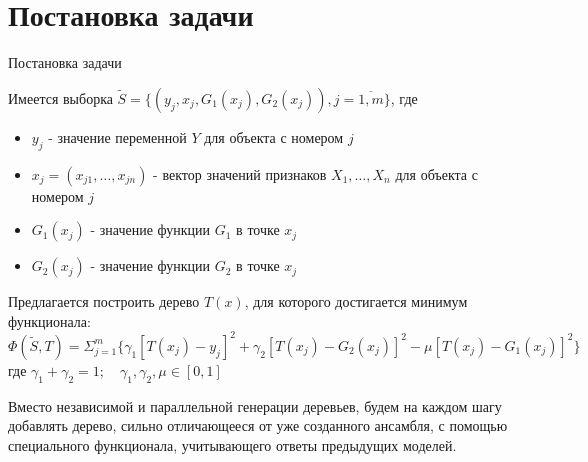 \documentclass[10pt,pdf,hyperref={unicode}]{beamer}
\begin{document}
	\section{Постановка задачи}
	\begin{frame}{Постановка задачи}
		
		Имеется выборка $\tilde{S} = \{ (y_j, x_j, G_1(x_j), G_2(x_j)), j = \overline{1, m} \}$, где
		\begin{itemize}
			\item $y_j$ - значение переменной $Y$ для объекта с номером $j$
			\item $x_j = (x_{j1}, \dots, x_{jn})$ - вектор значений признаков $X_1, \dots, X_n$ для объекта с номером $j$
			\item $G_1(x_j)$ - значение функции $G_1$ в точке $x_j$
			\item $G_2(x_j)$ - значение функции $G_2$ в точке $x_j$
		\end{itemize}
		
		Предлагается построить дерево $T(x)$, для которого достигается минимум функционала:
		$$ \Phi(\tilde{S}, T) = \Sigma_{j=1}^{m} \{ \gamma_1 [T(x_j) - y_j]^2 + \gamma_2 [T(x_j) - G_2(x_j)]^2 - \mu [T(x_j) - G_1(x_j)]^2   \}  $$
		где $\gamma_1 + \gamma_2 = 1; \quad \gamma_1, \gamma_2, \mu \in [0, 1] $
		
		\bigskip
		
		Вместо независимой и параллельной генерации деревьев,
		будем на каждом шагу добавлять дерево, сильно отличающееся от уже
		созданного ансамбля, с помощью специального функционала,
		учитывающего ответы предыдущих моделей.
		

	\end{frame}
	

\end{document}
